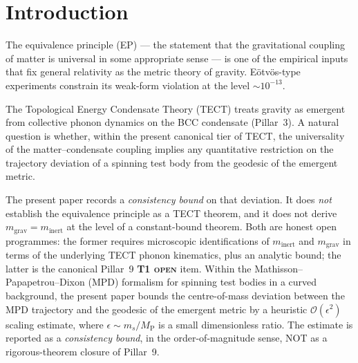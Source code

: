 \maketitle

\section{Introduction}\label{sec:intro}
The equivalence principle (EP) --- the statement that the
gravitational coupling of matter is universal in some appropriate
sense --- is one of the empirical inputs that fix general relativity
as the metric theory of gravity. Eötvös-type experiments constrain
its weak-form violation at the level $\sim 10^{-13}$.

The Topological Energy Condensate Theory (TECT) treats gravity as
emergent from collective phonon dynamics on the BCC condensate
(Pillar~3). A natural question is whether, within the present
canonical tier of TECT, the universality of the matter--condensate
coupling implies any quantitative restriction on the trajectory
deviation of a spinning test body from the geodesic of the
emergent metric.

The present paper records a \emph{consistency bound} on that
deviation. It does \emph{not} establish the equivalence principle
as a TECT theorem, and it does not derive
$m_{\mathrm{grav}} = m_{\mathrm{inert}}$ at the level of a
constant-bound theorem. Both are honest open programmes: the
former requires microscopic identifications of $m_{\mathrm{inert}}$
and $m_{\mathrm{grav}}$ in terms of the underlying TECT phonon
kinematics, plus an analytic bound; the latter is the canonical
Pillar~9 \textbf{T1 \textsc{open}} item. Within the
Mathisson--Papapetrou--Dixon (MPD) formalism for spinning test
bodies in a curved background, the present paper bounds the
centre-of-mass deviation between the MPD trajectory and the
geodesic of the emergent metric by a heuristic
$\mathcal{O}(\epsilon^2)$ scaling estimate, where
$\epsilon \sim m_s / M_{\mathrm{P}}$ is a small dimensionless ratio.
The estimate is reported as a \emph{consistency bound}, in the
order-of-magnitude sense, NOT as a rigorous-theorem closure of
Pillar~9.

